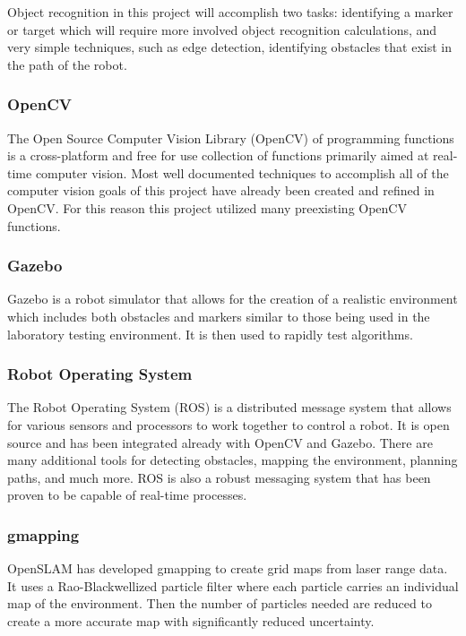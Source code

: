 \documentclass{article}[12]
\begin{document}
		Object recognition in this project will accomplish two tasks: identifying a marker or target which will require more involved object recognition calculations, and very simple techniques, such as edge detection, identifying obstacles that exist in the path of the robot.
		
		\subsubsection{OpenCV}
		
		The Open Source Computer Vision Library (OpenCV) of programming functions is a cross-platform and free for use collection of functions primarily aimed at real-time computer vision.\cite{opencv} Most well documented techniques to accomplish all of the computer vision goals of this project have already been created and refined in OpenCV.\cite{woods2015dynamic} For this reason this project utilized many preexisting OpenCV functions.
		
		\subsubsection{Gazebo}
		
		Gazebo is a robot simulator that allows for the creation of a realistic environment which includes both obstacles and markers similar to those being used in the laboratory testing environment. It is then used to rapidly test algorithms.
		
		\subsubsection{Robot Operating System}
		
		The Robot Operating System (ROS) is a distributed message system that allows for various sensors and processors to work together to control a robot. It is open source and has been integrated already with OpenCV and Gazebo. There are many additional tools for detecting obstacles, mapping the environment, planning paths, and much more. ROS is also a robust messaging system that has been proven to be capable of real-time processes.
		
		\subsubsection{gmapping}
		
		OpenSLAM has developed gmapping to create grid maps from laser range data. It uses a Rao-Blackwellized particle filter where each particle carries an individual map of the environment. Then the number of particles needed are reduced to create a more accurate map with significantly reduced uncertainty.\cite{grisetti_stachniss_burgard}
		
\end{document}
